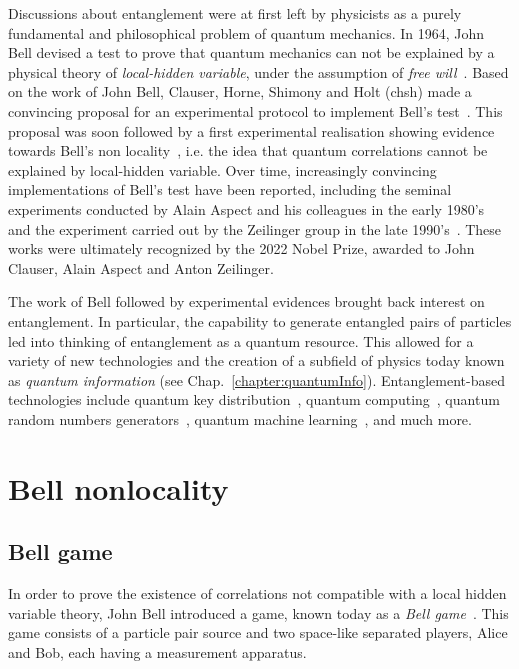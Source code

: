 \medbreak
Discussions about entanglement were at first left by physicists as a purely fundamental and philosophical problem of quantum mechanics.
In 1964, John Bell devised a test to prove that quantum mechanics can not be explained by a physical theory of \textit{local-hidden variable}, under the assumption of \textit{free will}~\cite{Bell1964}. 
Based on the work of John Bell, Clauser, Horne, Shimony and Holt (\acrshort{chsh}) made a convincing proposal for an experimental protocol to implement Bell's test~\cite{Clauser1969}. 
This proposal was soon followed by a first experimental realisation showing evidence towards Bell's non locality~\cite{Freedman1972}, i.e. the idea that quantum correlations cannot be explained by local-hidden variable.
Over time, increasingly convincing implementations of Bell's test have been reported, including the seminal experiments conducted by Alain Aspect and his colleagues in the early 1980's~\cite{Aspect1982,Aspect1982b} and the experiment carried out by the Zeilinger group in the late 1990's~\cite{Weihs1998}.
These works were ultimately recognized by the 2022 Nobel Prize, awarded to John Clauser, Alain Aspect and Anton Zeilinger.

\medbreak
The work of Bell followed by experimental evidences brought back interest on entanglement.
In particular, the capability to generate entangled pairs of particles led into thinking of entanglement as a quantum resource.
This allowed for a variety of new technologies and the creation of a subfield of physics today known as \textit{quantum information} (see Chap.~\ref{chapter:quantumInfo}).
Entanglement-based technologies include quantum key distribution~\cite{Ekert1991}, quantum computing~\cite{Preskill2018}, quantum random numbers generators~\cite{Acin2016}, quantum machine learning~\cite{Biamonte2017}, and much more. 


\chapter{Bell nonlocality}
\label{section:nonlocality}


\section{Bell game}

In order to prove the existence of correlations not compatible with a local hidden variable theory, John Bell introduced a game, known today as a \textit{Bell game}~\cite{Bell1964}.
This game consists of a particle pair source and two space-like separated players, Alice and Bob, each having a measurement apparatus.

